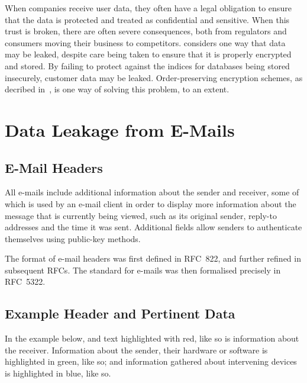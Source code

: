 When companies receive user data, they often have a legal obligation to ensure
that the data is protected and treated as confidential and sensitive.  When
this trust is broken, there are often severe consequences, both from regulators
and consumers moving their business to competitors.
\cite{squicciarini2010preventing} considers one way that data may be leaked,
despite care being taken to ensure that it is properly encrypted and stored. By
failing to protect against the indices for databases being stored insecurely,
customer data may be leaked.  Order-preserving encryption schemes, as decribed
in~\cite{agrawal2004order}, is one way of solving this problem, to an extent.

\section{Data Leakage from E-Mails}

\subsection{E-Mail Headers}

All e-mails include additional information about the sender and receiver, some
of which is used by an e-mail client in order to display more information about
the message that is currently being viewed, such as its original sender,
reply-to addresses and the time it was sent.  Additional fields allow senders to
authenticate themselves using public-key methods.

The format of e-mail headers was first defined in RFC~822, and further refined in
subsequent RFCs.  The standard for e-mails was then formalised precisely in
RFC~5322.

\subsection{Example Header and Pertinent Data}

In the example below, and text highlighted with red, \colorbox{red!30}{like
so} is information about the receiver.  Information about the sender, their
hardware or software is highlighted in green, \colorbox{green!30}{like so}; and
information gathered about intervening devices is highlighted in blue,
\colorbox{blue!30}{like so}.

